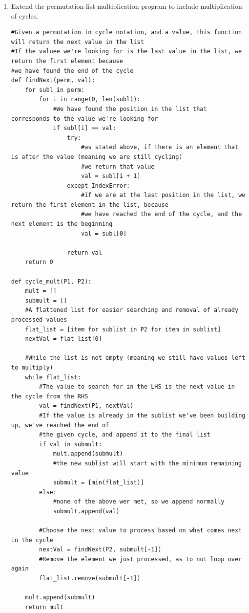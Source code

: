\documentclass[12pt]{article}
\begin{document}
\begin{enumerate}
  \item Extend the permutation-list multiplication program to include multiplication of cycles.
    \begin{lstlisting}
#Given a permutation in cycle notation, and a value, this function will return the next value in the list
#If the valuee we're looking for is the last value in the list, we return the first element because
#we have found the end of the cycle
def findNext(perm, val):
    for subl in perm:
        for i in range(0, len(subl)):
            #We have found the position in the list that corresponds to the value we're looking for
            if subl[i] == val:
                try:
                    #as stated above, if there is an element that is after the value (meaning we are still cycling)
                    #we return that value
                    val = subl[i + 1]
                except IndexError:
                    #If we are at the last position in the list, we return the first element in the list, because
                    #we have reached the end of the cycle, and the next element is the beginning
                    val = subl[0]

                return val
    return 0

def cycle_mult(P1, P2):
    mult = []
    submult = []
    #A flattened list for easier searching and removal of already processed values
    flat_list = [item for sublist in P2 for item in sublist]
    nextVal = flat_list[0]

    #While the list is not empty (meaning we still have values left to multiply)
    while flat_list:
        #The value to search for in the LHS is the next value in the cycle from the RHS
        val = findNext(P1, nextVal)
        #If the value is already in the sublist we've been building up, we've reached the end of
        #the given cycle, and append it to the final list
        if val in submult:
            mult.append(submult)
            #the new sublist will start with the minimum remaining value
            submult = [min(flat_list)]
        else:
            #none of the above wer met, so we append normally
            submult.append(val)

        #Choose the next value to process based on what comes next in the cycle
        nextVal = findNext(P2, submult[-1])
        #Remove the element we just processed, as to not loop over again
        flat_list.remove(submult[-1])

    mult.append(submult)
    return mult




\end{lstlisting}
\end{enumerate}
\end{document}
